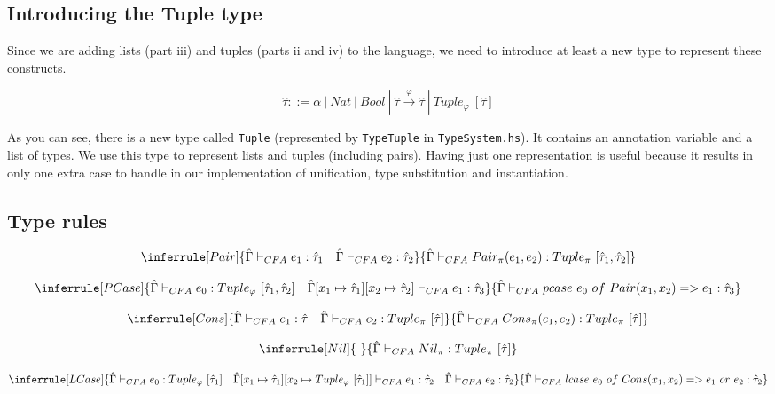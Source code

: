 \documentclass{article}
\begin{document}
\subsection{Introducing the Tuple type}

Since we are adding lists (part iii) and tuples (parts ii and iv) to the language, we need to introduce at least a new type to represent these constructs.

\[\hat{\tau} ::= \alpha\ |\ Nat\ |\ Bool\ |\ \hat{\tau} \overset{\varphi}{\rightarrow} \hat{\tau}\ |\ Tuple_\varphi\ [\hat{\tau}] \]

As you can see, there is a new type called \texttt{Tuple} (represented by \texttt{TypeTuple} in \texttt{TypeSystem.hs}).
It contains an annotation variable and a list of types.
We use this type to represent lists and tuples (including pairs).
Having just one representation is useful because it results in only one extra case to handle in our implementation of unification, type substitution and instantiation.

\subsection{Type rules}

\[
\inferrule[Pair]{\hat{\Gamma} \vdash_{CFA} e_1 : \hat{\tau}_1 \quad \hat{\Gamma} \vdash_{CFA} e_2 : \hat{\tau}_2}
{\hat{\Gamma} \vdash_{CFA} Pair_\pi(e_1, e_2) : Tuple_\pi\ [\hat{\tau}_1, \hat{\tau}_2]}
\]

\bigskip

\[
\inferrule[PCase]
{\hat{\Gamma} \vdash_{CFA} e_0 : Tuple_\varphi\ [\hat{\tau}_1, \hat{\tau}_2] \quad \hat{\Gamma}[x_1 \mapsto \hat{\tau}_1][x_2 \mapsto \hat{\tau}_2] \vdash_{CFA} e_1 : \hat{\tau}_3}
{\hat{\Gamma} \vdash_{CFA} pcase\ e_0\ of\ Pair(x_1, x_2) => e_1 : \hat{\tau}_3}
\]

\bigskip
\[
\inferrule[Cons]
{\hat{\Gamma} \vdash_{CFA} e_1 : \hat{\tau} \quad \hat{\Gamma} \vdash_{CFA} e_2 : Tuple_\pi\ [\hat{\tau}]}
{\hat{\Gamma} \vdash_{CFA} Cons_\pi(e_1, e_2) : Tuple_\pi\ [\hat{\tau}] }
\]

\bigskip

\[
\inferrule[Nil]{\ }{\hat{\Gamma} \vdash_{CFA} Nil_\pi : Tuple_\pi\ [\hat{\tau}]}
\]

\bigskip

\[
\inferrule[LCase]
{\hat{\Gamma} \vdash_{CFA} e_0 : Tuple_\varphi\ [\hat{\tau}_1] \quad \hat{\Gamma}[x_1 \mapsto \hat{\tau}_1][x_2 \mapsto Tuple_\varphi\ [\hat{\tau}_1]] \vdash_{CFA} e_1 : \hat{\tau}_2 \quad \hat{\Gamma} \vdash_{CFA} e_2 : \hat{\tau}_2}
{\hat{\Gamma} \vdash_{CFA} lcase\ e_0\ of\ Cons(x_1, x_2) => e_1\ or\ e_2 : \hat{\tau}_2}
\]
\end{document}
